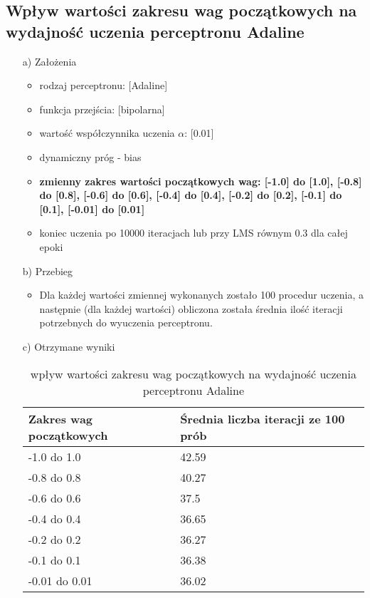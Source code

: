 \documentclass[17pt]{article}
\begin{document}
\subsection{Wpływ wartości zakresu wag początkowych na wydajność uczenia perceptronu Adaline}
\vspace{4mm}
\begin{enumerate}

\item[a)] Założenia

\begin{itemize}
\item rodzaj perceptronu: [Adaline]
\item funkcja przejścia: [bipolarna]
\item wartość współczynnika uczenia $\alpha$: [0.01]
\item dynamiczny próg - bias
\item \textbf{zmienny zakres wartości początkowych wag: [-1.0] do [1.0], [-0.8] do [0.8], [-0.6] do [0.6], [-0.4] do [0.4], [-0.2] do [0.2], [-0.1] do [0.1], [-0.01] do [0.01]}
\item koniec uczenia po 10000 iteracjach lub przy LMS równym 0.3 dla całej epoki
\end{itemize}

\item[b)] Przebieg

\begin{itemize}
\item Dla każdej wartości zmiennej wykonanych zostało 100 procedur uczenia, a następnie (dla każdej wartości) obliczona została średnia ilość iteracji potrzebnych do wyuczenia perceptronu.
\end{itemize}
\item[c)] Otrzymane wyniki

\begin{table}[ht]
\centering
\begin{tabular}{|p{4cm}|p{4cm}|}
 \hline
 Zakres wag początkowych & Średnia liczba iteracji ze 100 prób\\ \hline
 -1.0 do 1.0 & 42.59\\ 
 -0.8 do 0.8 & 40.27\\ 
 -0.6 do 0.6 & 37.5\\ 
 -0.4 do 0.4 & 36.65\\ 
 -0.2 do 0.2 & 36.27\\ 
 -0.1 do 0.1 & 36.38\\ 
 -0.01 do 0.01 & 36.02\\ 
 \hline
\end{tabular}
\caption{\label{tab:table5}wpływ wartości zakresu wag początkowych na wydajność uczenia perceptronu Adaline}
\end{table}


\end{enumerate}
\end{document}
